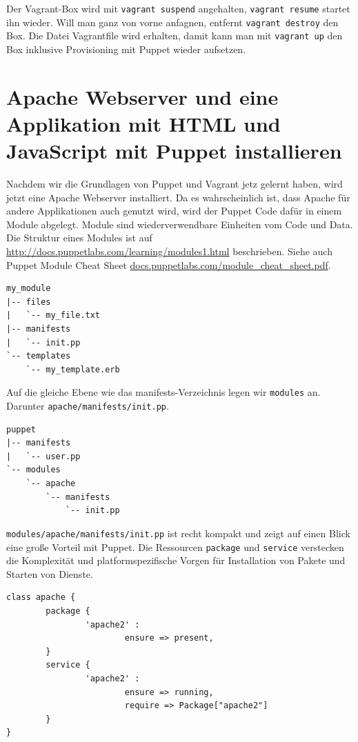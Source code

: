 \documentclass[12pt,a4paper,ngerman]{article}
\begin{document}
Der Vagrant-Box wird mit \lstinline$vagrant suspend$ angehalten, \lstinline$vagrant resume$ startet ihn wieder. Will man ganz von vorne anfagnen, entfernt \lstinline$vagrant destroy$ den Box. Die Datei Vagrantfile wird erhalten, damit kann man mit \lstinline$vagrant up$ den Box inklusive Provisioning mit Puppet wieder aufsetzen.

\section{Apache Webserver und eine Applikation mit HTML und JavaScript mit Puppet installieren}
Nachdem wir die Grundlagen von Puppet und Vagrant jetz gelernt haben, wird jetzt eine Apache Webserver installiert. Da es wahrscheinlich ist, dass Apache für andere Applikationen auch genutzt wird, wird der Puppet Code dafür in einem Module abgelegt. Module sind wiederverwendbare Einheiten vom Code und Data. Die Struktur eines Modules ist auf \url{http://docs.puppetlabs.com/learning/modules1.html} beschrieben. Siehe auch Puppet Module Cheat Sheet \url{docs.puppetlabs.com/module_cheat_sheet.pdf}.

\begin{lstlisting}[language=tree,caption=Puppet Module Struktur, label=module_structure]
my_module
|-- files
|   `-- my_file.txt
|-- manifests
|   `-- init.pp
`-- templates
    `-- my_template.erb
\end{lstlisting}


Auf die gleiche Ebene wie das manifests-Verzeichnis legen wir \lstinline$modules$ an. Darunter \lstinline$apache/manifests/init.pp$.
\begin{lstlisting}[language=tree,caption=Verzeichnisstruktur für den apache-Module, label=apache-module]
puppet
|-- manifests
|   `-- user.pp
`-- modules
    `-- apache
        `-- manifests
            `-- init.pp
\end{lstlisting}

\lstinline$modules/apache/manifests/init.pp$ ist recht kompakt und zeigt auf einen Blick eine große Vorteil mit Puppet. Die Ressourcen \lstinline$package$ und \lstinline$service$ verstecken die Komplexität und platformspezifische Vorgen für Installation von Pakete und Starten von Dienste.
\begin{lstlisting}[language=puppet,caption=Inhalt von modules/apache/manifests/init.pp, label=apache-init.pp]
class apache {
        package {
                'apache2' :
                        ensure => present,
        }
        service {
                'apache2' :
                        ensure => running,
                        require => Package["apache2"]
        }
}
\end{lstlisting}
\end{document}
